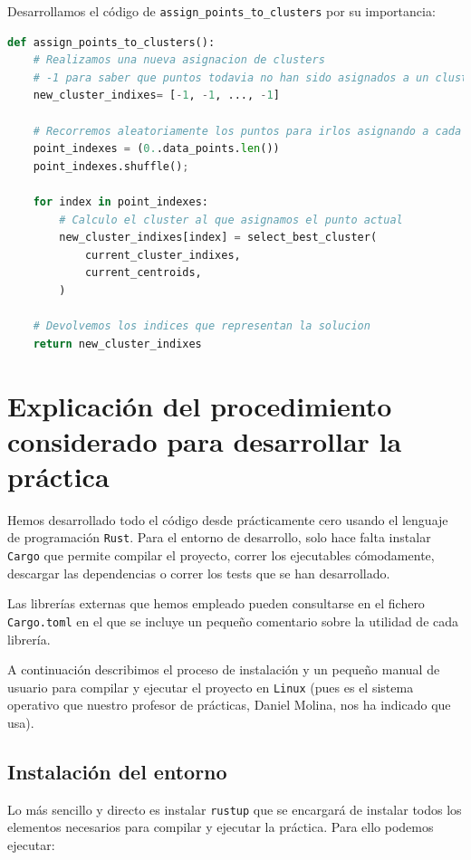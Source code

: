 \documentclass[11pt]{article}
\begin{document}
Desarrollamos el código de \lstinline{assign_points_to_clusters} por su importancia:

\begin{lstlisting}[language=Python, style=Boxed]
def assign_points_to_clusters():
    # Realizamos una nueva asignacion de clusters
    # -1 para saber que puntos todavia no han sido asignados a un cluster
    new_cluster_indixes= [-1, -1, ..., -1]

    # Recorremos aleatoriamente los puntos para irlos asignando a cada cluster
    point_indexes = (0..data_points.len())
    point_indexes.shuffle();

    for index in point_indexes:
        # Calculo el cluster al que asignamos el punto actual
        new_cluster_indixes[index] = select_best_cluster(
            current_cluster_indixes,
            current_centroids,
        )

    # Devolvemos los indices que representan la solucion
    return new_cluster_indixes
\end{lstlisting}

\pagebreak

\section{Explicación del procedimiento considerado para desarrollar la práctica}

Hemos desarrollado todo el código desde prácticamente cero usando el lenguaje de programación \lstinline{Rust}. Para el entorno de desarrollo, solo hace falta instalar \lstinline{Cargo} que permite compilar el proyecto, correr los ejecutables cómodamente, descargar las dependencias o correr los tests que se han desarrollado.

Las librerías externas que hemos empleado pueden consultarse en el fichero \lstinline{Cargo.toml} en el que se incluye un pequeño comentario sobre la utilidad de cada librería.

A continuación describimos el proceso de instalación y un pequeño manual de usuario para compilar y ejecutar el proyecto en \lstinline{Linux} (pues es el sistema operativo que nuestro profesor de prácticas, Daniel Molina, nos ha indicado que usa).

\subsection{Instalación del entorno}

Lo más sencillo y directo es instalar \lstinline{rustup} \footnotemark que se encargará de instalar todos los elementos necesarios para compilar y ejecutar la práctica. Para ello podemos ejecutar:
\end{document}
